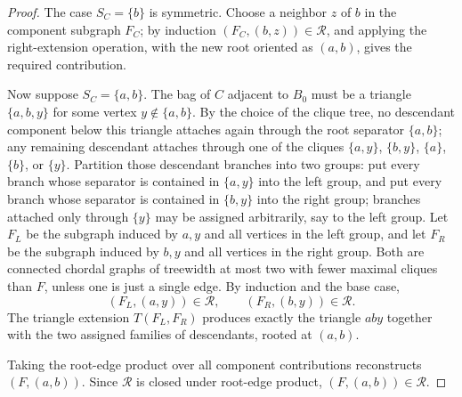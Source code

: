 \documentclass[11pt]{article}
\newcommand{\cR}{\mathcal{R}}
\begin{document}
\begin{proof}
The case $S_C=\{b\}$ is symmetric.  Choose a neighbor $z$ of $b$ in the component subgraph $F_C$; by induction $(F_C,(b,z))\in\cR$, and applying the right-extension operation, with the new root oriented as $(a,b)$, gives the required contribution.

Now suppose $S_C=\{a,b\}$.  The bag of $C$ adjacent to $B_0$ must be a triangle $\{a,b,y\}$ for some vertex $y\notin\{a,b\}$.  By the choice of the clique tree, no descendant component below this triangle attaches again through the root separator $\{a,b\}$; any remaining descendant attaches through one of the cliques $\{a,y\}$, $\{b,y\}$, $\{a\}$, $\{b\}$, or $\{y\}$.  Partition those descendant branches into two groups: put every branch whose separator is contained in $\{a,y\}$ into the left group, and put every branch whose separator is contained in $\{b,y\}$ into the right group; branches attached only through $\{y\}$ may be assigned arbitrarily, say to the left group.  Let $F_L$ be the subgraph induced by $a,y$ and all vertices in the left group, and let $F_R$ be the subgraph induced by $b,y$ and all vertices in the right group.  Both are connected chordal graphs of treewidth at most two with fewer maximal cliques than $F$, unless one is just a single edge.  By induction and the base case,
\[
(F_L,(a,y))\in\cR,
\qquad
(F_R,(b,y))\in\cR.
\]
The triangle extension $T(F_L,F_R)$ produces exactly the triangle $a b y$ together with the two assigned families of descendants, rooted at $(a,b)$.

Taking the root-edge product over all component contributions reconstructs $(F,(a,b))$.  Since $\cR$ is closed under root-edge product, $(F,(a,b))\in\cR$.
\end{proof}
\end{document}
